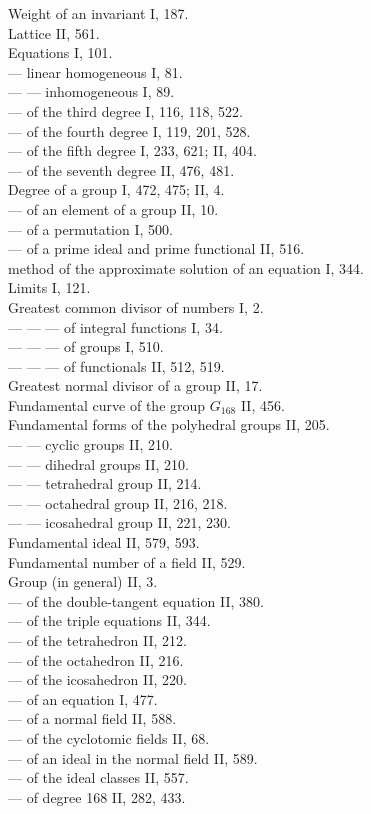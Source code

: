 Weight of an invariant I, 187.\\
Lattice II, 561.\\
Equations I, 101.\\
--- linear homogeneous I, 81.\\
--- --- inhomogeneous I, 89.\\
--- of the third degree I, 116, 118, 522.\\
--- of the fourth degree I, 119, 201, 528.\\
--- of the fifth degree I, 233, 621; II, 404.\\
--- of the seventh degree II, 476, 481.\\
Degree of a group I, 472, 475; II, 4.\\
--- of an element of a group II, 10.\\
--- of a permutation I, 500.\\
--- of a prime ideal and prime functional II, 516.\\
 method of the approximate solution of an equation I, 344.\\
Limits I, 121.\\
Greatest common divisor of numbers I, 2.\\
--- --- --- of integral functions I, 34.\\
--- --- --- of groups I, 510.\\
--- --- --- of functionals II, 512, 519.\\
Greatest normal divisor of a group II, 17.\\
Fundamental curve of the group $G_{168}$ II, 456.\\
Fundamental forms of the polyhedral groups II, 205.\\
--- --- cyclic groups II, 210.\\
--- --- dihedral groups II, 210.\\
--- --- tetrahedral group II, 214.\\
--- --- octahedral group II, 216, 218.\\
--- --- icosahedral group II, 221, 230.\\
Fundamental ideal II, 579, 593.\\
Fundamental number of a field II, 529.\\
Group (in general) II, 3.\\
--- of the double-tangent equation II, 380.\\
--- of the triple equations II, 344.\\
--- of the tetrahedron II, 212.\\
--- of the octahedron II, 216.\\
--- of the icosahedron II, 220.\\
--- of an equation I, 477.\\
--- of a normal field II, 588.\\
--- of the cyclotomic fields II, 68.\\
--- of an ideal in the normal field II, 589.\\
--- of the ideal classes II, 557.\\
--- of degree 168 II, 282, 433.\\
